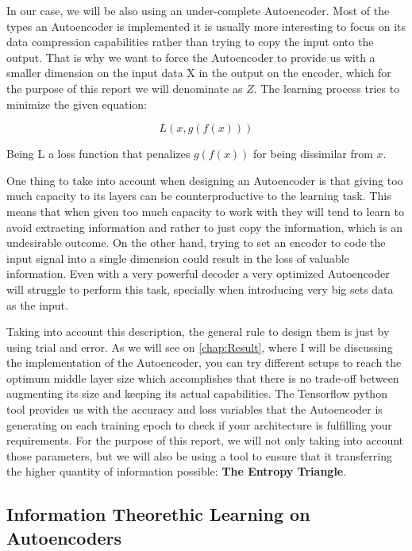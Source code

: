 In our case, we will be also using an under-complete Autoencoder. Most of the types an Autoencoder is implemented it is usually more interesting to focus on its data compression capabilities rather than trying to copy the input onto the output. That is why we want to force the Autoencoder to provide us with a smaller dimension on the input data X in the output on the encoder, which for the purpose of this report we will denominate as $Z$. The learning process tries to minimize the given equation: \par

\begin{equation}\label{eq:artificial neuron}
L(x,g(f(x)))
\end{equation}

Being L a loss function that penalizes $g(f(x))$ for being dissimilar from $x$.

One thing to take into account when designing an Autoencoder is that giving too much capacity to its layers can be counterproductive to the learning task. This means that when given too much capacity to work with they will tend to learn to avoid extracting information and rather to just copy the information, which is an undesirable outcome. On the other hand, trying to set an encoder to code the input signal into a single dimension could result in the loss of valuable information. Even with a very powerful decoder a very optimized Autoencoder will struggle to perform this task, specially when introducing very big sets data as the input. \par

Taking into account this description, the general rule to design them is just by using trial and error. As we will see on \ref{chap:Result}, where I will be discussing the implementation of the Autoencoder, you can try different setups to reach the optimum middle layer size which accomplishes that there is no trade-off between augmenting its size and keeping its actual capabilities. The Tensorflow python tool provides us with the accuracy and loss variables that the Autoencoder is generating on each training epoch to check if your architecture is fulfilling your requirements. For the purpose of this report, we will not only taking into account those parameters, but we will also be using a tool to ensure that it transferring the higher quantity of information possible: \textbf{The Entropy Triangle}.

\subsection{Information Theorethic Learning on Autoencoders}

